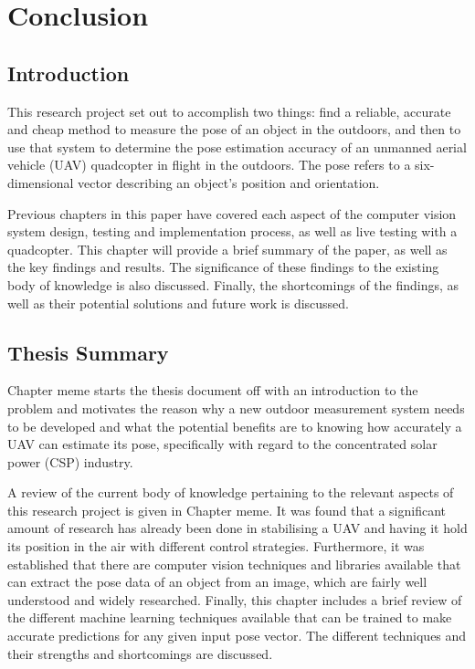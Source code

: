 \chapter{Conclusion}
\label{chap6}

\section{Introduction}

This research project set out to accomplish two things: find a reliable, accurate and cheap method to measure the pose of an object in the outdoors, and then to use that system to determine the pose estimation accuracy of an unmanned aerial vehicle (UAV) quadcopter in flight in the outdoors. The pose refers to a six-dimensional vector describing an object's position and orientation. 

Previous chapters in this paper have covered each aspect of the computer vision system design, testing and implementation process, as well as live testing with a quadcopter. This chapter will provide a brief summary of the paper, as well as the key findings and results. The significance of these findings to the existing body of knowledge is also discussed. Finally, the shortcomings of the findings, as well as their potential solutions and future work is discussed. 

\section{Thesis Summary}

Chapter meme starts the thesis document off with an introduction to the problem and motivates the reason why a new outdoor measurement system needs to be developed and what the potential benefits are to knowing how accurately a UAV can estimate its pose, specifically with regard to the concentrated solar power (CSP) industry.  

A review of the current body of knowledge pertaining to the relevant aspects of this research project is given in Chapter meme. It was found that a significant amount of research has already been done in stabilising a UAV and having it hold its position in the air with different control strategies. Furthermore, it was established that there are computer vision techniques and libraries available that can extract the pose data of an object from an image, which are fairly well understood and widely researched. Finally, this chapter includes a brief review of the different machine learning techniques available that can be trained to make accurate predictions for any given input pose vector. The different techniques and their strengths and shortcomings are discussed.  


